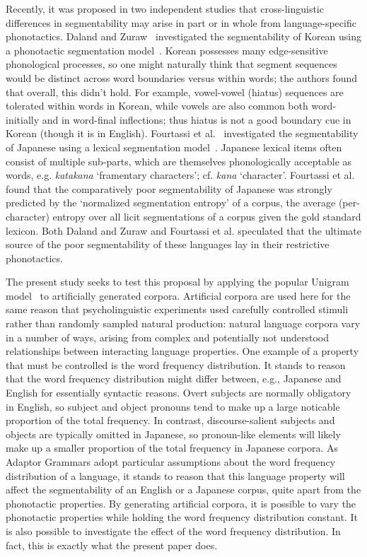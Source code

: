\documentclass[11pt]{article}
\begin{document}
Recently, it was proposed in two independent studies that cross-linguistic differences in segmentability may arise in part or in whole from language-specific phonotactics. Daland and Zuraw~ investigated the segmentability of Korean using a phonotactic segmentation model~\cite{Daland11a}. Korean possesses many edge-sensitive phonological processes, so one might naturally think that segment sequences would be distinct across word boundaries versus within words; the authors found that overall, this didn't hold. For example, vowel-vowel (hiatus) sequences are tolerated within words in Korean, while vowels are also common both word-initially and in word-final inflections; thus hiatus is not a good boundary cue in Korean (though it is in English). Fourtassi et al.~ investigated the segmentability of Japanese using a lexical segmentation model~\cite{Goldwater09a}. Japanese lexical items often consist of multiple sub-parts, which are themselves phonologically acceptable as words, e.g. \textit{katakana} `framentary characters'; cf. \textit{kana} `character'. Fourtassi et al. found that the comparatively poor segmentability of Japanese was strongly predicted by the `normalized segmentation entropy' of a corpus, the average (per-character) entropy over all licit segmentations of a corpus given the gold standard lexicon. Both Daland and Zuraw and Fourtassi et al. speculated that the ultimate source of the poor segmentability of these languages lay in their restrictive phonotactics.

The present study seeks to test this proposal by applying the popular Unigram model~\cite{Brent99a,Goldwater09a} to artificially generated corpora. Artificial corpora are used here for the same reason that psycholinguistic experiments used carefully controlled stimuli rather than randomly sampled natural production: natural language corpora vary in a number of ways, arising from complex and potentially not understood relationships between interacting language properties. One example of a property that must be controlled is the word frequency distribution. It stands to reason that the word frequency distribution might differ between, e.g., Japanese and English for essentially syntactic reasons. Overt subjects are normally obligatory in English, so subject and object pronouns tend to make up a large noticable proportion of the total frequency. In contrast, discourse-salient subjects and objects are typically omitted in Japanese, so pronoun-like elements will likely make up a smaller proportion of the total frequency in Japanese corpora. As Adaptor Grammars adopt particular assumptions about the word frequency distribution of a language, it stands to reason that this language property will affect the segmentability of an English or a Japanese corpus, quite apart from the phonotactic properties. By generating artificial corpora, it is possible to vary the phonotactic properties while holding the word frequency distribution constant. It is also possible to investigate the effect of the word frequency distribution. In fact, this is exactly what the present paper does.
\end{document}
